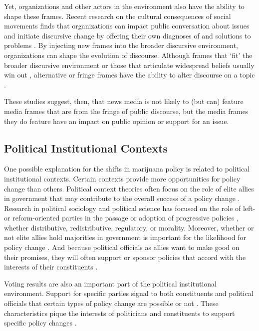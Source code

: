 Yet, organizations and other actors in the environment also have the ability to shape these frames. Recent research on the cultural consequences of social movements \citep{earl_2004} finds that organizations can impact public conversation about issues \citep{bail_et_al_2017} and initiate discursive change by offering their own diagnoses of and solutions to problems \citep{bail_2012,snow_et_al_2007,benford_and_snow_2000}. By injecting new frames into the broader discursive environment, organizations can shape the evolution of discourse. Although frames that `fit' the broader discursive environment \citep{mccammon_et_al_2007} or those that articulate widespread beliefs usually win out \citep{mccammon_et_al_2001,snow_et_al_2007,gamson_and_modigliani_1989}, alternative or fringe frames have the ability to alter discourse on a topic \citep{bail_2012}.

These studies suggest, then, that news media is not likely to (but can) feature media frames that are from the fringe of public discourse, but the media frames they do feature have an impact on public opinion or support for an issue. 


\subsection{Political Institutional Contexts}

One possible explanation for the shifts in marijuana policy is related to political institutional contexts. Certain contexts provide more opportunities for policy change than others. Political context theories often focus on the role of elite allies in government that may contribute to the overall success of a policy change \citep{amenta_et_al_1994,amenta_2006}. Research in political sociology and political science has focused on the role of left- or reform-oriented parties in the passage or adoption of progressive policies \citep{amenta_and_elliott_2019,amenta_et_al_2005,korpi_1983}, whether distributive, redistributive, regulatory, or morality. Moreover, whether or not elite allies hold majorities in government is important for the likelihood for policy change \citep{ansolabehere_and_snyder2006,winters_1976,abramowitz_1983,campagna_and_grofman_1990}. And because political officials as allies want to make good on their promises, they will often support or sponsor policies that accord with the interests of their constituents \citep{page_and_shapiro_1983,mayhew_1974,downs_1957,stimson_et_al_1995}. 

Voting results are also an important part of the political institutional environment. Support for specific parties signal to both constituents and political officials that certain types of policy change are possible or not \citep{amenta_and_elliott_2019}. These characteristics pique the interests of politicians and constituents to support specific policy changes \citep{berry_and_berry_1990,boushey_2016}. 

